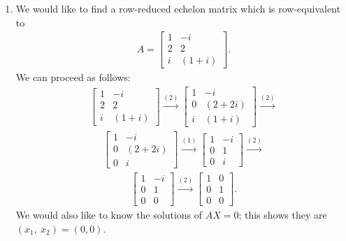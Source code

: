 \documentclass[12pt]{article}
\begin{document}
\begin{enumerate}
  \item
    We would like to find a row-reduced echelon matrix which is
    row-equivalent to
    \begin{align*}
      A =
      \begin{bmatrix}
        1 & -i\\
        2 & 2\\
        i & (1 + i)
      \end{bmatrix}.
    \end{align*}
    We can proceed as follows:
    \begin{align*}
      \begin{bmatrix}
        1 & -i\\
        2 & 2\\
        i & (1 + i)
      \end{bmatrix}
      \xrightarrow{(2)}
      \begin{bmatrix}
        1 & -i\\
        0 & (2 + 2i)\\
        i & (1 + i)
      \end{bmatrix}
      \xrightarrow{(2)}
    \end{align*}
    \begin{align*}
      \begin{bmatrix}
        1 & -i\\
        0 & (2 + 2i)\\
        0 & i
      \end{bmatrix}
      \xrightarrow{(1)}
      \begin{bmatrix}
        1 & -i\\
        0 & 1\\
        0 & i
      \end{bmatrix}
      \xrightarrow{(2)}
    \end{align*}
    \begin{align*}
      \begin{bmatrix}
        1 & -i\\
        0 & 1\\
        0 & 0
      \end{bmatrix}
      \xrightarrow{(2)}
      \begin{bmatrix}
        1 & 0\\
        0 & 1\\
        0 & 0
      \end{bmatrix}.
    \end{align*}
    We would also like to know the solutions of $AX = 0$; this
    shows they are $(x_1,\ x_2) = (0,0)$.
\end{enumerate}
\end{document}
